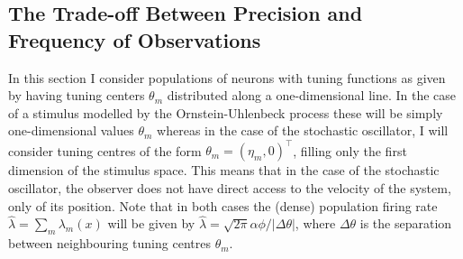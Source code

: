 \subsection{The Trade-off Between Precision and Frequency of Observations}
\label{sec:information}

In this section I consider populations of neurons with tuning functions as given by  having tuning centers $\theta_m$ distributed along a 
one-dimensional line.
In the case of a stimulus modelled by the Ornstein-Uhlenbeck process these will be simply one-dimensional values $\theta_m$ whereas in the case of the stochastic oscillator, I will
consider tuning centres of the form $\theta_m = (\eta_m,0)^\top$, filling only the first dimension of the stimulus space. This means that in the case of the stochastic oscillator, the 
observer does not have direct access to the velocity of the system, only of its position. Note that  in both cases the (dense) population
firing
rate $\hat{\lambda} = \sum_m \lambda_m (x)$ will be given by $\hat{\lambda} = \sqrt{2\pi} \alpha \phi / |\Delta \theta|$, where $\Delta \theta$ is the separation between neighbouring tuning centres $\theta_m$.\par

